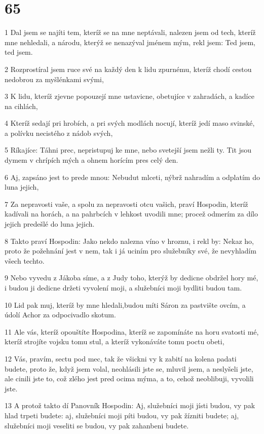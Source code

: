 \chapter{65}

\par 1 Dal jsem se najíti tem, kteríž se na mne neptávali, nalezen jsem od tech, kteríž mne nehledali, a národu, kterýž se nenazýval jménem mým, rekl jsem: Ted jsem, ted jsem.
\par 2 Rozprostíral jsem ruce své na každý den k lidu zpurnému, kteríž chodí cestou nedobrou za myšlénkami svými,
\par 3 K lidu, kteríž zjevne popouzejí mne ustavicne, obetujíce v zahradách, a kadíce na cihlách,
\par 4 Kteríž sedají pri hrobích, a pri svých modlách nocují, kteríž jedí maso svinské, a polívku necistého z nádob svých,
\par 5 Ríkajíce: Táhni prec, nepristupuj ke mne, nebo svetejší jsem nežli ty. Tit jsou dymem v chrípích mých a ohnem horícím pres celý den.
\par 6 Aj, zapsáno jest to prede mnou: Nebudut mlceti, nýbrž nahradím a odplatím do luna jejich,
\par 7 Za nepravosti vaše, a spolu za nepravosti otcu vašich, praví Hospodin, kteríž kadívali na horách, a na pahrbcích v lehkost uvodili mne; procež odmerím za dílo jejich predešlé do luna jejich.
\par 8 Takto praví Hospodin: Jako nekdo nalezna víno v hroznu, i rekl by: Nekaz ho, proto že požehnání jest v nem, tak i já uciním pro služebníky své, že nevyhladím všech techto.
\par 9 Nebo vyvedu z Jákoba síme, a z Judy toho, kterýž by dedicne obdržel hory mé, i budou ji dedicne držeti vyvolení moji, a služebníci moji bydliti budou tam.
\par 10 Lid pak muj, kteríž by mne hledali,budou míti Sáron za pastvište ovcím, a údolí Achor za odpocivadlo skotum.
\par 11 Ale vás, kteríž opouštíte Hospodina, kteríž se zapomínáte na horu svatosti mé, kteríž strojíte vojsku tomu stul, a kteríž vykonáváte tomu poctu obeti,
\par 12 Vás, pravím, sectu pod mec, tak že všickni vy k zabití na kolena padati budete, proto že, když jsem volal, neohlásili jste se, mluvil jsem, a neslyšeli jste, ale cinili jste to, což zlého jest pred ocima mýma, a to, cehož neoblibuji, vyvolili jste.
\par 13 A protož takto dí Panovník Hospodin: Aj, služebníci moji jísti budou, vy pak hlad trpeti budete: aj, služebníci moji píti budou, vy pak žízniti budete; aj, služebníci moji veseliti se budou, vy pak zahanbeni budete.
